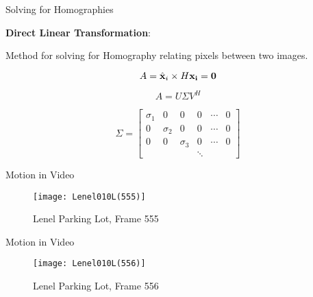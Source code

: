 \documentclass{beamer}
\begin{document}
\begin{frame}[t]{\sc Solving for Homographies}

\textbf{Direct Linear Transformation}:

\begin{center}
Method for solving for Homography relating pixels between two images.

\begin{equation}
\label{DLT}
    A=\hat{\bf{x}}_{i} \times H \bf{x}_{i}=0
\end{equation}

\begin{equation}
\label{DLTSVD}
    A=U \Sigma V^{H}
\end{equation}

\begin{equation}
\label{SVD}
    \Sigma = \begin{bmatrix}\sigma_{1}&0&0&0&\cdots&0 \\ 0&\sigma_{2}&0&0&\cdots&0 \\ 0&0&\sigma_{3}&0&\cdots&0 \\ &&&\ddots&& \end{bmatrix}
\end{equation}

\end{center}

\end{frame}



\begin{frame}[c]{\sc Motion in Video}

\begin{figure}[!h]
\centering
\texttt{[image: Lenel010L(555)]}
\caption{Lenel Parking Lot, Frame 555}
\label{Lenel555}
\end{figure}

\end{frame}

\begin{frame}[c]{\sc Motion in Video}

\begin{figure}[!h]
\centering
\texttt{[image: Lenel010L(556)]}
\caption{Lenel Parking Lot, Frame 556}
\label{Lenel556}
\end{figure}

\end{frame}
\end{document}
